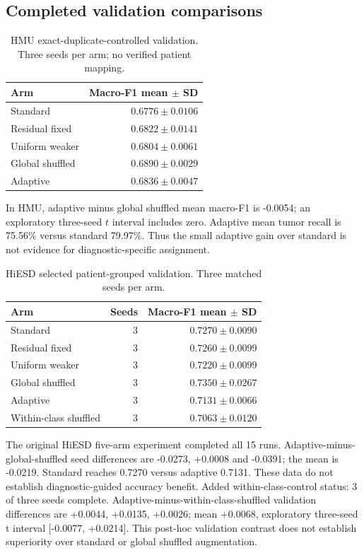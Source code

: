 \documentclass[conference]{IEEEtran}
\begin{document}
\subsection{Completed validation comparisons}
\begin{table}[t]\caption{HMU exact-duplicate-controlled validation. Three seeds per arm; no verified patient mapping.}\centering\begin{tabular}{lr}\toprule Arm & Macro-F1 mean $\pm$ SD\\\midrule
Standard & $0.6776\pm0.0106$\\
Residual fixed & $0.6822\pm0.0141$\\
Uniform weaker & $0.6804\pm0.0061$\\
Global shuffled & $0.6890\pm0.0029$\\
Adaptive & $0.6836\pm0.0047$\\
\bottomrule\end{tabular}\end{table}
In HMU, adaptive minus global shuffled mean macro-F1 is -0.0054; an exploratory three-seed $t$ interval includes zero. Adaptive mean tumor recall is 75.56\% versus standard 79.97\%. Thus the small adaptive gain over standard is not evidence for diagnostic-specific assignment.

\begin{table}[t]\caption{HiESD selected patient-grouped validation. Three matched seeds per arm.}\centering\begin{tabular}{lrr}\toprule Arm & Seeds & Macro-F1 mean $\pm$ SD\\\midrule
Standard & 3 & $0.7270\pm0.0090$\\
Residual fixed & 3 & $0.7260\pm0.0099$\\
Uniform weaker & 3 & $0.7220\pm0.0099$\\
Global shuffled & 3 & $0.7350\pm0.0267$\\
Adaptive & 3 & $0.7131\pm0.0066$\\
Within-class shuffled & 3 & $0.7063\pm0.0120$\\
\bottomrule\end{tabular}\end{table}
The original HiESD five-arm experiment completed all 15 runs. Adaptive-minus-global-shuffled seed differences are -0.0273, +0.0008 and -0.0391; the mean is -0.0219. Standard reaches 0.7270 versus adaptive 0.7131. These data do not establish diagnostic-guided accuracy benefit. Added within-class-control status: 3 of three seeds complete.
Adaptive-minus-within-class-shuffled validation differences are +0.0044, +0.0135, +0.0026; mean +0.0068, exploratory three-seed t interval [-0.0077, +0.0214]. This post-hoc validation contrast does not establish superiority over standard or global shuffled augmentation.
\end{document}
